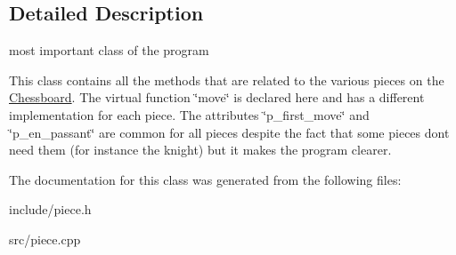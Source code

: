 \subsection{Detailed Description}
most important class of the program 

This class contains all the methods that are related to the various pieces on the \hyperlink{classChessboard}{Chessboard}. The virtual function \char`\"{}move\char`\"{} is declared here and has a different implementation for each piece. The attributes \char`\"{}p\+\_\+first\+\_\+move\char`\"{} and \char`\"{}p\+\_\+en\+\_\+passant\char`\"{} are common for all pieces despite the fact that some pieces don\textquotesingle{}t need them (for instance the knight) but it makes the program clearer. 

The documentation for this class was generated from the following files\+:\begin{DoxyCompactItemize}
\item 
include/piece.\+h\item 
src/piece.\+cpp\end{DoxyCompactItemize}
